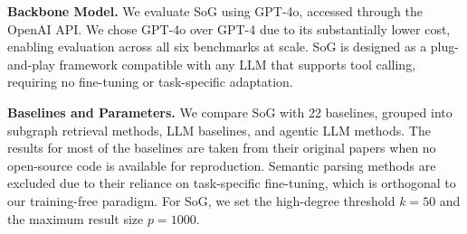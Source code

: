 \documentclass[sigconf]{acmart}
\begin{document}

\noindent\textbf{Backbone Model.} We evaluate SoG using GPT-4o, accessed through the OpenAI API. We chose GPT-4o over GPT-4 due to its substantially lower cost, enabling evaluation across all six benchmarks at scale. SoG is designed as a plug-and-play framework compatible with any LLM that supports tool calling, requiring no fine-tuning or task-specific adaptation.


\noindent\textbf{Baselines and Parameters.} We compare SoG with 22 baselines, grouped into subgraph retrieval methods, LLM baselines, and agentic LLM methods. The results for most of the baselines are taken from their original papers when no open-source code is available for reproduction. Semantic parsing methods are excluded due to their reliance on task-specific fine-tuning, which is orthogonal to our training-free paradigm. For SoG, we set the high-degree threshold $k=50$ and the maximum result size $p=1000$. %
\end{document}
